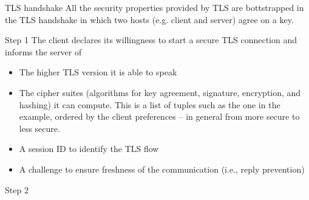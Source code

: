 \begin{parag}{TLS handshake}
    All the security properties provided by TLS are bottstrapped in the TLS handshake in which two hosts (e.g. client and server) agree on a key.
	\begin{subparag}{Step 1}
	    The client declares its willingness to start a secure TLS connection and informs the server of 
		\begin{itemize}
		    \item The higher TLS version it is able to speak
		    \item  The cipher suites (algorithms for key agreement, signature, encryption, and hashing) it can compute. This is a list of tuples such as the one in the example, ordered by the client preferences – in general from more secure to less secure.
		    \item  A session ID to identify the TLS flow
		    \item  A challenge to ensure freshness of the communication (i.e., reply prevention)
		\end{itemize}
	\end{subparag}
	\begin{subparag}{Step 2}


\end{subparag}
\end{parag}
